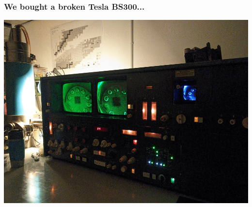 \documentclass[aspectratio=169]{beamer}
\begin{document}
\begin{frame}
\begin{columns}
\begin{column}{0.3\textwidth}
\begin{center}
			\end{center}
		\end{column}
	\end{columns}
\end{frame}

\begin{frame}
	\frametitle{We bought a broken Tesla BS300...}

	\begin{center}
		\includegraphics[height=0.9\textheight]{sem-01.jpg}
	\end{center}
\end{frame}
\end{document}
